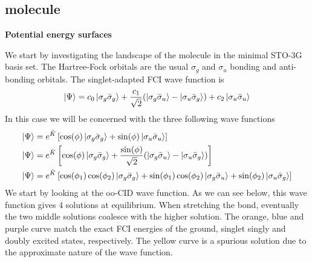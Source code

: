 \documentclass[11pt,a4paper]{article}
\newcommand{\hK}{\Hat{K}} %
\begin{document}
\subsection{ molecule}

\textbf{Potential energy surfaces}

We start by investigating the landscape of the  molecule in the minimal STO-3G basis set.
The Hartree-Fock orbitals are the usual $\sigma_g$ and $\sigma_u$ bonding and anti-bonding orbitals.
The singlet-adapted FCI wave function is
\begin{equation}
  \label{eq:H2_FCI_WF}
  \ket{\Psi} = c_0\ket{\sigma_g\bar{\sigma}_g} + \frac{c_1}{\sqrt{2}}(\ket{\sigma_g\bar{\sigma}_u} - \ket{\sigma_u\bar{\sigma}_g}) + c_2\ket{\sigma_u\bar{\sigma}_u}
\end{equation}
In this case we will be concerned with the three following wave functions
\begin{subequations}
  \begin{align}
    \ket{\Psi} &= e^{\hK}\left[\cos(\phi)\ket{\sigma_g\bar{\sigma}_g} + \sin(\phi)\ket{\sigma_u\bar{\sigma}_u}\right] \\
    \ket{\Psi} &= e^{\hK}\left[\cos(\phi)\ket{\sigma_g\bar{\sigma}_g} + \frac{\sin(\phi)}{\sqrt{2}}(\ket{\sigma_g\bar{\sigma}_u} - \ket{\sigma_u\bar{\sigma}_g})\right]  \\
    \ket{\Psi} &= e^{\hK}\left[\cos(\phi_1)\cos(\phi_2)\ket{\sigma_g\bar{\sigma}_g} + \sin(\phi_1)\cos(\phi_2)\ket{\sigma_g\bar{\sigma}_u} + \sin(\phi_2) \ket{\sigma_u\bar{\sigma}_g}\right]
  \end{align}
\end{subequations}
We start by looking at the oo-CID wave function. As we can see below, this wave function gives 4 solutions at equilibrium. When stretching the bond, eventually the two middle solutions coalesce with the higher solution.
The orange, blue and purple curve match the exact FCI energies of the ground, singlet singly and doubly excited states, respectively.
The yellow curve is a spurious solution due to the approximate nature of the wave function.
\end{document}
